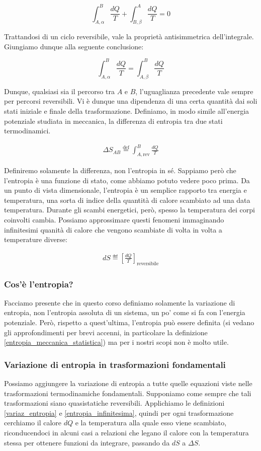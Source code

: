 \[ \int_{A,\alpha}^{B} \frac{dQ}{T} + \int_{B,\beta}^{A} \frac{dQ}{T} = 0 \]

\noindent Trattandosi di un ciclo reversibile, vale la proprietà antisimmetrica
dell'integrale. Giungiamo dunque alla seguente conclusione:

\[ \int_{A,\alpha}^{B} \frac{dQ}{T} = \int_{A,\beta}^{B} \frac{dQ}{T} \]

\noindent Dunque, qualsiasi sia il percorso tra $A$ e $B$, l'uguaglianza
precedente vale sempre per percorsi reversibili. Vi è dunque una dipendenza
di una certa quantità dai soli stati iniziale e finale della trasformazione.
Definiamo, in modo simile all'energia potenziale studiata in meccanica,
la differenza di entropia tra due stati termodinamici.

\begin{align}
    \Delta S_{AB} \stackrel{\text{def}}{=} \int_{A,\text{rev}}^{B} \frac{dQ}{T}\label{variaz_entropia}
\end{align}

\noindent Definiremo solamente la differenza, non l'entropia in sé.
Sappiamo però che l'entropia è una funzione di stato, come abbiamo
potuto vedere poco prima. Da un punto di vista dimensionale, l'entropia
è un semplice rapporto tra energia e temperatura, una sorta di
indice della quantità di calore scambiato ad una data temperatura.
Durante gli scambi energetici, però, spesso la temperatura dei corpi
coinvolti cambia. Possiamo approssimare questi fenomeni immaginando
infinitesimi quanità di calore che vengono scambiate di volta in volta
a temperature diverse:

\begin{align}
    dS \eqdef \left[\frac{dQ}{T}\right]_\text{reversibile}\label{entropia_infinitesima}
\end{align}

\subsubsection*{Cos'è l'entropia?}
Facciamo presente che in questo corso definiamo solamente la variazione
di entropia, non l'entropia assoluta di un sistema, un po' come si fa
con l'energia potenziale. Però, rispetto a quest'ultima, l'entropia
può essere definita (si vedano gli approfondimenti per brevi accenni,
in particolare la definizione \ref{entropia_meccanica_statistica}) ma
per i nostri scopi non è molto utile.


\subsubsection*{Variazione di entropia in trasformazioni fondamentali}
Possiamo aggiungere la variazione di entropia a tutte quelle equazioni viste nelle
trasformazioni termodinamiche fondamentali. Supponiamo come sempre
che tali trasformazioni siano quasistatiche reversibili. Applichiamo
le definizioni \ref{variaz_entropia} e \ref{entropia_infinitesima},
quindi per ogni trasformazione cerchiamo il calore $dQ$ e
la temperatura alla quale esso viene scambiato, riconducendoci
in alcuni casi a relazioni che legano il calore con la temperatura
stessa per ottenere funzioni da integrare, passando da $dS$ a $\Delta S$.

